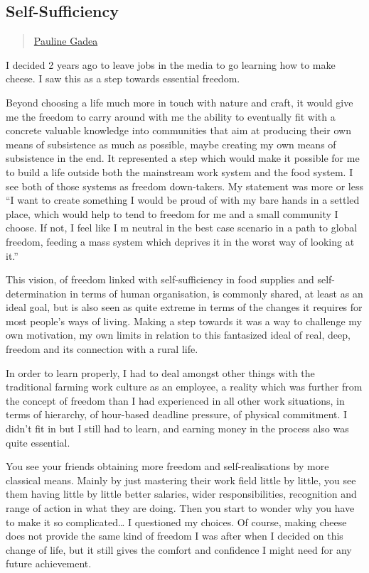 \subsection{Self-Sufficiency}\label{self-sufficiency}

\begin{quote}
\hyperlink{pauline-gadea}{Pauline Gadea}
\end{quote}

I decided 2 years ago to leave jobs in the media to go learning how to
make cheese. I saw this as a step towards essential freedom.

Beyond choosing a life much more in touch with nature and craft, it
would give me the freedom to carry around with me the ability to
eventually fit with a concrete valuable knowledge into communities that
aim at producing their own means of subsistence as much as possible,
maybe creating my own means of subsistence in the end. It represented a
step which would make it possible for me to build a life outside both
the mainstream work system and the food system. I see both of those
systems as freedom down-takers. My statement was more or less ``I want
to create something I would be proud of with my bare hands in a settled
place, which would help to tend to freedom for me and a small community
I choose. If not, I feel like I m neutral in the best case scenario in a
path to global freedom, feeding a mass system which deprives it in the
worst way of looking at it.''

This vision, of freedom linked with self-sufficiency in food supplies
and self-determination in terms of human organisation, is commonly
shared, at least as an ideal goal, but is also seen as quite extreme in
terms of the changes it requires for most people's ways of living.
Making a step towards it was a way to challenge my own motivation, my
own limits in relation to this fantasized ideal of real, deep, freedom
and its connection with a rural life.

In order to learn properly, I had to deal amongst other things with the
traditional farming work culture as an employee, a reality which was
further from the concept of freedom than I had experienced in all other
work situations, in terms of hierarchy, of hour-based deadline pressure,
of physical commitment. I didn't fit in but I still had to learn, and
earning money in the process also was quite essential.

You see your friends obtaining more freedom and self-realisations by
more classical means. Mainly by just mastering their work field little
by little, you see them having little by little better salaries, wider
responsibilities, recognition and range of action in what they are
doing. Then you start to wonder why you have to make it so
complicated\ldots{} I questioned my choices. Of course, making cheese
does not provide the same kind of freedom I was after when I decided on
this change of life, but it still gives the comfort and confidence I
might need for any future achievement.

